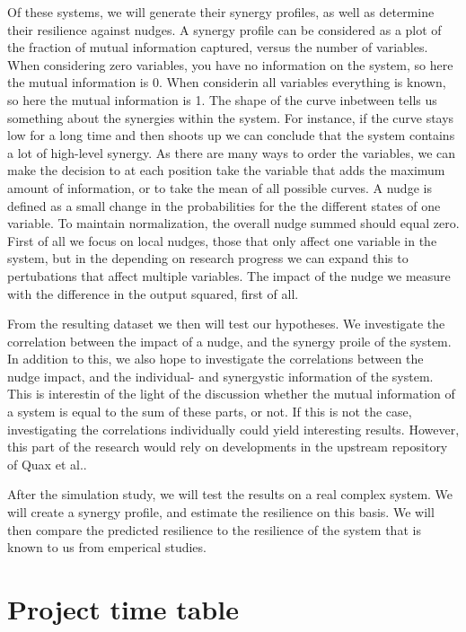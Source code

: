 \documentclass[11pt]{article}
\begin{document}
Of these systems, we will generate their synergy profiles, as well as determine their resilience against nudges.
A synergy profile can be considered as a plot of the fraction of mutual information captured, versus the number of variables. 
When considering zero variables, you have no information on the system, so here the mutual information is 0.
When considerin all variables everything is known, so here the mutual information is 1.
The shape of the curve inbetween tells us something about the synergies within the system.
For instance, if the curve stays low for a long time and then shoots up we can conclude that the system contains a lot of high-level synergy.
As there are many ways to order the variables, we can make the decision to at each position take the variable that adds the maximum amount of information, or to take the mean of all possible curves.
A nudge is defined as a small change in the probabilities for the the different states of one variable.
To maintain normalization, the overall nudge summed should equal zero.
First of all we focus on local nudges, those that only affect one variable in the system, but in the depending on research progress we can expand this to pertubations that affect multiple variables.
The impact of the nudge we measure with the difference in the output squared, first of all.


From the resulting dataset we then will test our hypotheses.
We investigate the correlation between the impact of a nudge, and the synergy proile of the system.
In addition to this, we also hope to investigate the correlations between the nudge impact, and the individual- and synergystic information of the system.
This is interestin of the light of the discussion whether the mutual information of a system is equal to the sum of these parts, or not. 
If this is not the case, investigating the correlations individually could yield interesting results.
However, this part of the research would rely on developments in the upstream repository of Quax et al..


After the simulation study, we will test the results on a real complex system.
We will create a synergy profile, and estimate the resilience on this basis.
We will then compare the predicted resilience to the resilience of the system that is known to us from emperical studies.

\section{Project time table}
\end{document}
